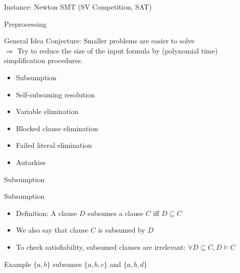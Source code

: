 \documentclass[t]{sdqbeamer}
\begin{document}
\begin{frame}{Instance: Newton SMT (SV Competition, SAT)}{
}
{}
\end{frame}

    
\begin{frame}{Preprocessing}
    \begin{block}{General Idea}
      Conjecture: Smaller problems are easier to solve\\[1em]
      $\Longrightarrow$ Try to reduce the size of the input formula by (polynomial time) simplification procedures.
    \begin{itemize}
      \item Subsumption
      \item Self-subsuming resolution
      \item Variable elimination
      \item Blocked clause elimination
      \item Failed literal elimination
      \item Autarkies
    \end{itemize}
    \end{block}
    \end{frame}
    
    
    \begin{frame}{Subsumption}
    \begin{block}{Subsumption}
    \begin{itemize}
    \item Definition: A clause $D$ subsumes a clause $C$ iff $D \subseteq C$
    \item We also say that clause $C$ is subsumed by $D$
    \item To check satisfiability, subsumed clauses are irrelevant: $\forall D \subseteq C, D \models C$
    \end{itemize}
    \end{block}
    
    \begin{exampleblock}{Example}
    $\{a, b\}$ subsumes $\{a, b, c\}$ and $\{a, b, d\}$
    \end{exampleblock}
    \end{frame}
    
\end{document}
